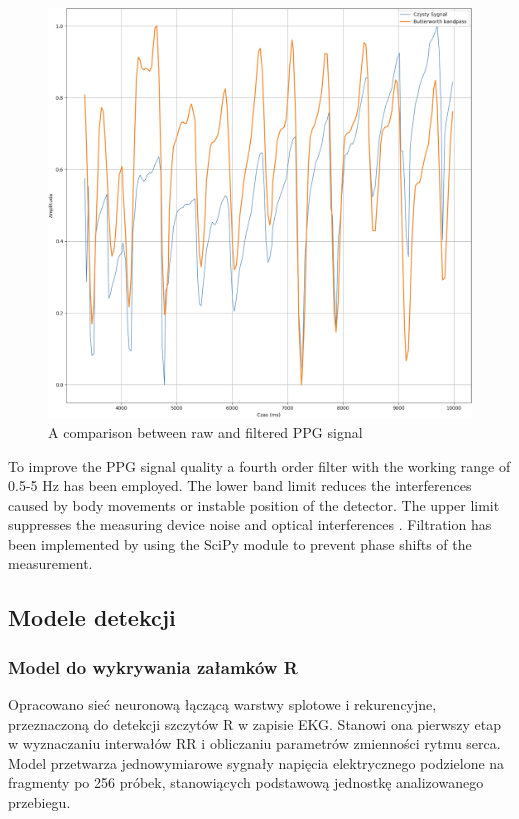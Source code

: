 \documentclass[journal]{IEEEtran}
\begin{document}
{\begin{figure}[htbp]
    \centering
    \includegraphics[width=0.76\linewidth]{Filtr_PPG.png} 
    \caption{A comparison between raw and filtered PPG signal}
    \label{fig:filtr_ppg}
\end{figure}

To improve the PPG signal quality a fourth order filter with the working range of 0.5-5 Hz has been employed. The lower band limit reduces the interferences caused by body movements or instable position of the detector. The upper limit suppresses the measuring device noise and optical interferences \cite{26}. Filtration has been implemented by using the SciPy module to prevent phase shifts of the measurement.

\newpage
\subsection{Modele detekcji}
\subsubsection{Model do wykrywania załamków R}
Opracowano sieć neuronową łączącą warstwy splotowe i rekurencyjne, przeznaczoną do detekcji szczytów R w zapisie EKG. Stanowi ona pierwszy etap w wyznaczaniu interwałów RR i obliczaniu parametrów zmienności rytmu serca. Model przetwarza jednowymiarowe sygnały napięcia elektrycznego podzielone na fragmenty po 256 próbek, stanowiących podstawową jednostkę analizowanego przebiegu.

}
\end{document}
